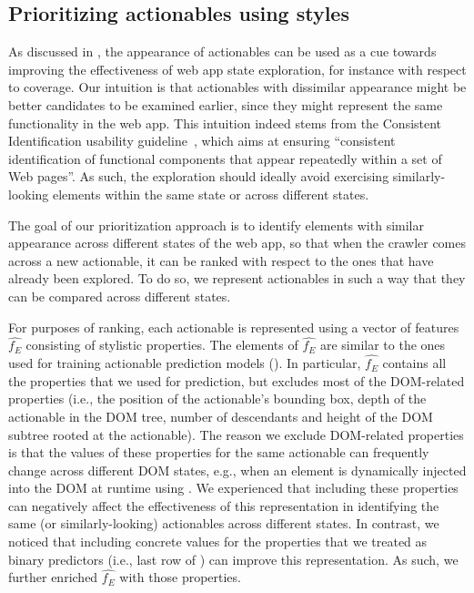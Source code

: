 \subsection{Prioritizing actionables using styles}
\label{sec:prioritization}

As discussed in ,
the appearance of actionables
can be used as a cue
towards improving the effectiveness of web app state exploration, for instance with respect to coverage.
Our intuition is that actionables with dissimilar appearance 
might be better candidates to be examined earlier, %
since they might represent the same functionality in the web app.
This intuition indeed stems from the Consistent Identification usability guideline~\cite{w3c-consistent-identification},
which aims at ensuring ``consistent identification of functional components
that appear repeatedly within a set of Web pages''.
As such, the exploration should ideally avoid exercising similarly-looking elements 
within the same state or across different states.



The goal of our prioritization approach is to identify elements with similar appearance 
across different states of the web app,
so that when the crawler comes across a new actionable,
it can be ranked with respect to the 
ones that have already been explored.
To do so, we represent actionables in such a way that 
they can be compared across different states.

For purposes of ranking, each actionable
is represented using a vector of features $\hat{f_E}$
consisting of stylistic properties.
The elements of $\hat{f_E}$ are similar to the ones used
for training actionable prediction models
().
In particular, $\hat{f_E}$ contains all the \css properties that we used for prediction,
but excludes most of the DOM-related properties
(i.e., the position of the actionable's bounding box, 
depth of the actionable in the DOM tree,
number of descendants and height of the DOM subtree rooted at the actionable).
The reason we exclude DOM-related properties is that
the values of these properties for the same actionable can frequently change across different DOM states,
e.g., when an element is dynamically injected into the DOM 
at runtime using \js.
We experienced that including these properties
can negatively affect the effectiveness of this representation
in identifying the same (or similarly-looking) actionables across different states.
In contrast, 
we noticed that including concrete values for the \css properties
that we treated as binary predictors (i.e., last row of )
can improve this representation.
As such, we further enriched $\hat{f_E}$ with those \css properties.

